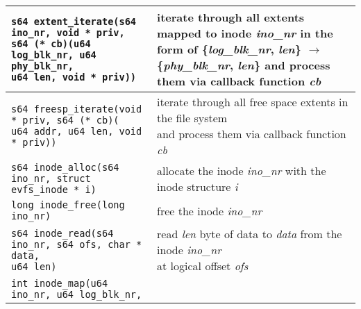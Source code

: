 \begin{table*}
\begin{center}
\begin{small}
\begin{tabular}[t]{|l|l|}
\hline 
\makecell[l]{\texttt{s64 extent\_iterate(s64 ino\_nr, void * priv,} \\ 
\hspace{1em}\texttt{s64 (* cb)(u64 log\_blk\_nr, u64 phy\_blk\_nr,} \\
\hspace{6.75em}\texttt{u64 len, void * priv))}} & \makecell[l]{iterate through all extents mapped to inode \textit{ino\_nr} in \\ the form of \{\textit{log\_blk\_nr}, \textit{len}\} $\rightarrow$ \{\textit{phy\_blk\_nr}, \textit{len}\} \\ and process them via callback function \textit{cb}} \\
\hline 
\makecell[l]{\texttt{s64 freesp\_iterate(void * priv, s64 (* cb)(} \\ 
\hspace{1em}\texttt{u64 addr, u64 len, void * priv))}} & \makecell[l]{iterate through all free space extents in the file system \\ and process them via callback function \textit{cb}} \\
\hline
\hline
\texttt{s64 inode\_alloc(s64 ino\_nr, struct evfs\_inode * i)} & allocate the inode \textit{ino\_nr} with the inode structure \textit{i} \\
\hline 
\texttt{long inode\_free(long ino\_nr)} & free the inode \textit{ino\_nr} \\
\hline 
\makecell[l]{\texttt{s64 inode\_read(s64 ino\_nr, s64 ofs, char * data,} \\
\hspace{7.85em}\texttt{u64 len)}} & \makecell[l]{read \textit{len} byte of data to \textit{data}
 from the inode \textit{ino\_nr} \\ at logical offset \textit{ofs}} \\
\hline 
\makecell[l]{\texttt{int inode\_map(u64 ino\_nr, u64 log\_blk\_nr,} \\
}
\end{tabular}
\end{small}
\end{center}
\end{table*}
